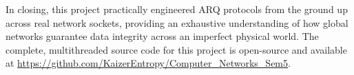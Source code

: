 \documentclass[12pt, a4paper]{article}
\begin{document}
In closing, this project practically engineered ARQ protocols from the ground up across real network sockets, providing an exhaustive understanding of how global networks guarantee data integrity across an imperfect physical world. The complete, multithreaded source code for this project is open-source and available at \url{https://github.com/KaizerEntropy/Computer_Networks_Sem5}.
\end{document}
